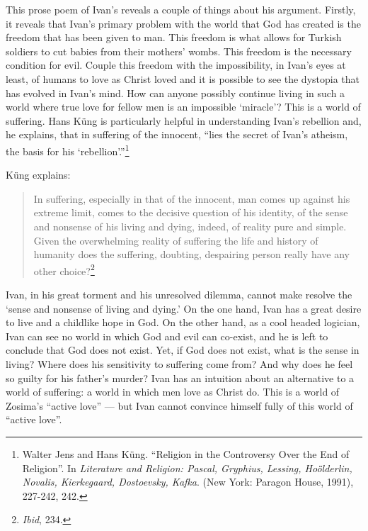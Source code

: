This prose poem of Ivan's reveals a couple of things about his argument. Firstly, it reveals that Ivan's primary problem with the world that God has created is the freedom that has been given to man. This freedom is what allows for Turkish soldiers to cut babies from their mothers' wombs. This freedom is the necessary condition for evil. Couple this freedom with the impossibility, in Ivan's eyes at least, of humans to love as Christ loved and it is possible to see the dystopia that has evolved in Ivan's mind. How can anyone possibly continue living in such a world where true love for fellow men is an impossible `miracle'? This is a world of suffering. Hans K\"{u}ng is particularly helpful in understanding Ivan's rebellion and, he explains, that in suffering of the innocent, ``lies the secret of Ivan's atheism, the basis for his `rebellion'.''\footnote{Walter Jens and Hans K\"{u}ng. ``Religion in the Controversy Over the End of Religion''. In \emph{Literature and Religion: Pascal, Gryphius, Lessing, Ho\"{o}̈lderlin, Novalis, Kierkegaard, Dostoevsky, Kafka}. (New York: Paragon House, 1991), 227-242, 242.}

K\"{u}ng explains: 

\begin{quote}
\singlespacing
In suffering, especially in that of the innocent, man comes up against his extreme limit, comes to the decisive question of his identity, of the sense and nonsense of his living and dying, indeed, of reality pure and simple. Given the overwhelming reality of suffering the life and history of humanity does the suffering, doubting, despairing person really have any other choice?\footnote{\emph{Ibid}, 234.} 
\end{quote} Ivan, in his great torment and his unresolved dilemma, cannot make resolve the `sense and nonsense of living and dying.' On the one hand, Ivan has a great desire to live and a childlike hope in God. On the other hand, as a cool headed logician, Ivan can see no world in which God and evil can co-exist, and he is left to conclude that God does not exist. Yet, if God does not exist, what is the sense in living? Where does his sensitivity to suffering come from? And why does he feel so guilty for his father's murder? Ivan has an intuition about an alternative to a world of suffering: a world in which men love as Christ do. This is a world of Zosima's ``active love'' --- but Ivan cannot convince himself fully of this world of ``active love''.

